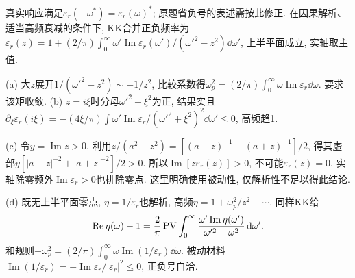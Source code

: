 \begin{solution}
真实响应满足$\varepsilon_r(-\omega^*)=\varepsilon_r(\omega)^*$; 原题省负号的表述需按此修正. 在因果解析、适当高频衰减的条件下, KK合并正负频率为
$\varepsilon_r(z)=1+(2/\pi)\int_0^\infty\omega'\operatorname{Im}\varepsilon_r(\omega')/(\omega'^2-z^2)\dd\omega'$, 上半平面成立, 实轴取主值.

(a) 大$z$展开$1/(\omega'^2-z^2)\sim-1/z^2$, 比较系数得$\omega_p^2=(2/\pi)\int_0^\infty\omega\operatorname{Im}\varepsilon_r\dd\omega$. 要求该矩收敛. (b) $z=i\xi$时分母$\omega'^2+\xi^2$为正, 结果实且$\partial_\xi\varepsilon_r(i\xi)=-(4\xi/\pi)\int\omega'\operatorname{Im}\varepsilon_r/(\omega'^2+\xi^2)^2\dd\omega'\le0$, 高频趋1.

(c) 令$y=\operatorname{Im}z>0$, 利用$z/(a^2-z^2)=[(a-z)^{-1}-(a+z)^{-1}]/2$, 得其虚部$y[|a-z|^{-2}+|a+z|^{-2}]/2>0$. 所以$\operatorname{Im}[z\varepsilon_r(z)]>0$, 不可能$\varepsilon_r(z)=0$. 实轴除零频外$\operatorname{Im}\varepsilon_r>0$也排除零点. 这里明确使用被动性, 仅解析性不足以得此结论.

(d) 既无上半平面零点, $\eta=1/\varepsilon_r$也解析, 高频$\eta=1+\omega_p^2/z^2+\cdots$. 同样KK给\[
\operatorname{Re}\eta(\omega)-1=\frac2\pi\operatorname{PV}\int_0^\infty\frac{\omega'\operatorname{Im}\eta(\omega')}{\omega'^2-\omega^2}\,\mathrm d\omega'.
\]
和规则$-\omega_p^2=(2/\pi)\int_0^\infty\omega\operatorname{Im}(1/\varepsilon_r)\dd\omega$. 被动材料$\operatorname{Im}(1/\varepsilon_r)=-\operatorname{Im}\varepsilon_r/|\varepsilon_r|^2\le0$, 正负号自洽.
\end{solution}
